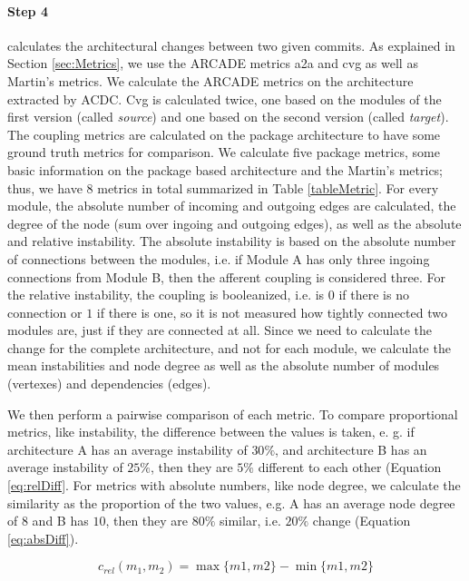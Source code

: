 \documentclass[sigplan, anonymous, review]{acmart}
\begin{document}
\paragraph{Step 4} calculates the architectural changes between two given commits.
As explained in Section \ref{sec:Metrics}, we use the ARCADE metrics a2a and cvg as well as Martin's metrics. We calculate the ARCADE metrics on the architecture extracted by ACDC. Cvg is calculated twice, one based on the modules of the first version (called \textit{source}) and one based on the second version (called \textit{target}).
The coupling metrics are calculated on the package architecture to have some ground truth metrics for comparison. We calculate five package metrics, some basic information on the package based architecture and the Martin's metrics; thus, we have 8 metrics in total summarized in Table \ref{tableMetric}.
For every module, the absolute number of incoming and outgoing edges are calculated, the degree of the node (sum over ingoing and outgoing edges), as well as the absolute and relative instability. The absolute instability is based on the absolute number of connections between the modules, i.e. if Module A has only three ingoing connections from Module B, then the afferent coupling is considered three. For the relative instability, the coupling is booleanized, i.e. is $0$ if there is no connection or $1$ if there is one, so it is not measured how tightly connected two modules are, just if they are connected at all.
Since we need to calculate the change for the complete architecture, and not for each module, we calculate the mean instabilities and node degree as well as the absolute number of modules (vertexes) and dependencies (edges).

We then perform a pairwise comparison of each metric. To compare proportional metrics, like instability, the difference between the values is taken, e. g. if architecture A has an average instability of $30\%$, and architecture B has an average instability of $25\%$, then they are $5\%$ different to each other (Equation \ref{eq:relDiff}. For metrics with absolute numbers, like node degree, we calculate the similarity as the proportion of the two values, e.g. A has an average node degree of $8$ and B has $10$, then they are $80\%$ similar, i.e. $20\%$ change (Equation \ref{eq:absDiff}).

\begin{equation} \label{eq:relDiff}
c_{rel}(m_1, m_2) =  \max\{m1, m2\} - \min\{m1, m2\}
\end{equation} 
\end{document}
